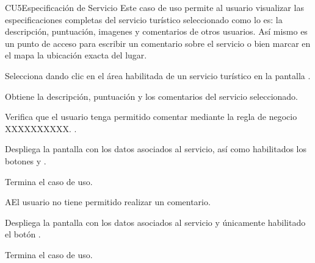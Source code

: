 
% 



	\begin{UseCase}{CU5}{Especificación de Servicio}{
		Este caso de uso permite al usuario visualizar las especificaciones completas del servicio turístico seleccionado como lo es: la descripción, puntuación, imagenes y comentarios de otros usuarios. Así mismo es un punto de acceso para escribir un comentario sobre el servicio o bien marcar en el mapa la ubicación exacta del lugar.
	}
	\end{UseCase}
	\begin{UCtrayectoria} 
		
		\UCpaso[\UCactor] Selecciona dando clic en el área habilitada de un servicio turístico en la pantalla .
		
		\UCpaso Obtiene la descripción, puntuación y los comentarios del servicio seleccionado.
		
		\UCpaso Verifica que el usuario tenga permitido comentar mediante la regla de negocio XXXXXXXXXX. .
		
		\UCpaso Despliega la pantalla  con los datos asociados al servicio, así como habilitados los botones  y .
		
		\UCpaso[] Termina el caso de uso.
		
	\end{UCtrayectoria}

		\begin{UCtrayectoriaA}{A}{El usuario no tiene permitido realizar un comentario.}
			
		\UCpaso Despliega la pantalla  con los datos asociados al servicio y únicamente habilitado el botón .
		
		\UCpaso[] Termina el caso de uso.
		
	\end{UCtrayectoriaA}
	
	